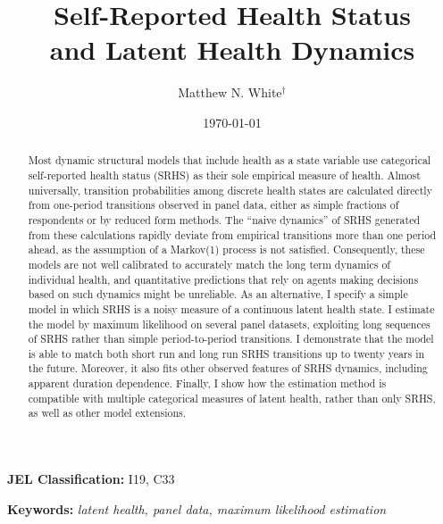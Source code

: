 \documentclass[12pt,pdftex,letterpaper]{article}
\begin{document}
\title{Self-Reported Health Status \\ and Latent Health Dynamics}
\author{Matthew N. White$^\dagger$}
\date{\today}

\begin{singlespace}
\maketitle

\begin{abstract}
	Most dynamic structural models that include health as a state variable use categorical self-reported health status (SRHS) as their sole empirical measure of health. Almost universally, transition probabilities among discrete health states are calculated directly from one-period transitions observed in panel data, either as simple fractions of respondents or by reduced form methods.  The ``naive dynamics'' of SRHS generated from these calculations rapidly deviate from empirical transitions more than one period ahead, as the assumption of a Markov(1) process is not satisfied.  Consequently, these models are not well calibrated to accurately match the long term dynamics of individual health, and quantitative predictions that rely on agents making decisions based on such dynamics might be unreliable.  As an alternative, I specify a simple model in which SRHS is a noisy measure of a continuous latent health state. I estimate the model by maximum likelihood on several panel datasets, exploiting long sequences of SRHS rather than simple period-to-period transitions.  I demonstrate that the model is able to match both short run and long run SRHS transitions up to twenty years in the future.  Moreover, it also fits other observed features of SRHS dynamics, including apparent duration dependence.  Finally, I show how the estimation method is compatible with multiple categorical measures of latent health, rather than only SRHS, as well as other model extensions.
\end{abstract}

\end{singlespace}

\noindent \textbf{JEL Classification:} I19, C33

\vspace{0.25cm}

\noindent \textbf{Keywords:} \textit{latent health, panel data, maximum likelihood estimation}
\end{document}
